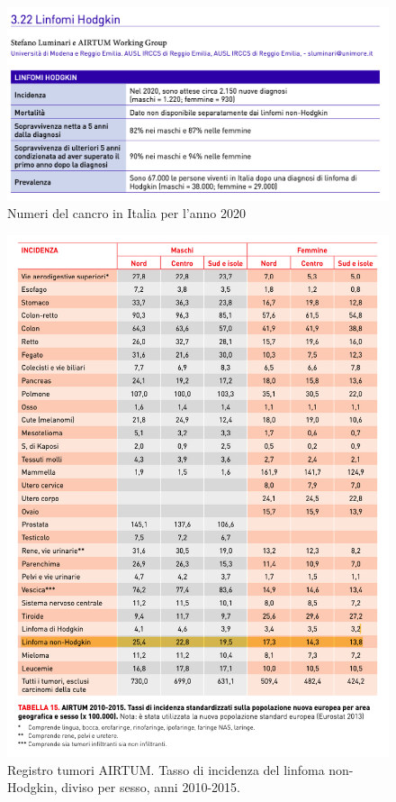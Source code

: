 \begin{figure}[H]
    \begin{center}
    \includegraphics[width=0.8\columnwidth]{img/2020.png}
    \vspace{-3mm}
    \end{center}
    \caption{Numeri del cancro in Italia per l’anno 2020
    \cite{img5}}

\end{figure}

\begin{figure}[H]
    \begin{center}
    \includegraphics[width=0.8\columnwidth]{img/INCIDENZA.png}
    \vspace{-3mm}
    \end{center}
    \caption{Registro tumori AIRTUM. Tasso di incidenza del linfoma non-Hodgkin, diviso per sesso, anni 2010-2015.
    \cite{img4-6-7}}

\end{figure}

